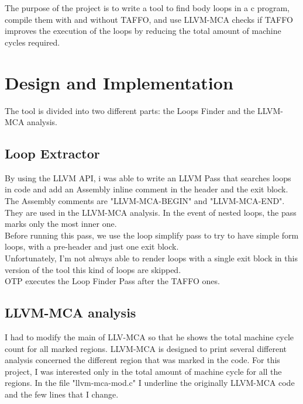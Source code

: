 The purpose of the project is to write a tool to find body loops in a c program, compile them with and without TAFFO, and use LLVM-MCA checks if TAFFO improves the execution of the loops by reducing the total amount of machine cycles required.

\section{Design and Implementation}
The tool is divided into two different parts: the Loops Finder and the LLVM-MCA analysis.

\subsection{Loop Extractor}
By using the LLVM API, i was able to write an LLVM Pass that searches loops in code and add an Assembly inline comment in the header and the exit block.\\
The Assembly comments are "LLVM-MCA-BEGIN" and "LLVM-MCA-END". They are used in the LLVM-MCA analysis.
In the event of nested loops, the pass marks only the most inner one.\\
Before running this pass, we use the loop simplify pass to try to have simple form loops, with a pre-header and just one exit block.\\
Unfortunately, I'm not always able to render loops with a single exit block in this version of the tool this kind of loops are skipped.\\
OTP executes the Loop Finder Pass after the TAFFO ones.\\

\subsection{LLVM-MCA analysis}

I had to modify the main of LLV-MCA so that he shows the total machine cycle count for all marked regions. LLVM-MCA is designed to print several different analysis concerned the different region that was marked in the code. For this project, I was interested only in the total amount of machine cycle for all the regions.
In the file "llvm-mca-mod.c" I underline the originally LLVM-MCA code and the few lines that I change.


